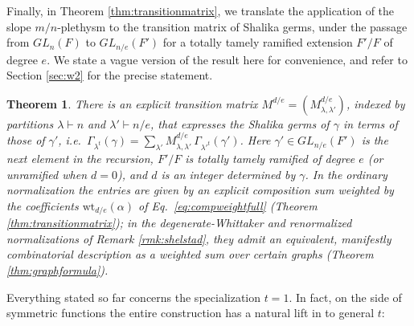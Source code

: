 \documentclass{amsart}
\numberwithin{equation}{section}
\newtheorem{theorem}[lemma]{Theorem}%
\theoremstyle{definition}
\newcommand{\wt}{\mathrm{wt}}
\begin{document}
Finally, in Theorem \ref{thm:transitionmatrix}, we translate the application of the slope $m/n$-plethysm to the transition matrix of Shalika germs, under the passage from $GL_n(F)$ to $GL_{n/e}(F')$ for a totally tamely ramified extension $F'/F$ of degree $e$. 
We state a vague version of the result here for convenience, and refer to Section \ref{sec:w2} for the precise statement. 
\begin{theorem}\label{thm:transitionforSha}
There is an explicit transition matrix $M^{d/e}=(M^{d/e}_{\lambda,\lambda'})$, indexed by partitions $\lambda\vdash n$ and $\lambda'\vdash n/e$, that expresses the Shalika germs of $\gamma$ in terms of those of $\gamma'$, i.e.\ $\Gamma_{\lambda^t}(\gamma)=\sum_{\lambda'}M^{d/e}_{\lambda,\lambda'}\,\Gamma_{{\lambda'}^t}(\gamma')$. Here $\gamma'\in GL_{n/e}(F')$ is the next element in the recursion, $F'/F$ is totally tamely ramified of degree $e$ (or unramified when $d=0$), and $d$ is an integer determined by $\gamma$. In the ordinary normalization the entries are given by an explicit composition sum weighted by the coefficients $\wt_{d/e}(\alpha)$ of Eq.~\eqref{eq:compweightfull} (Theorem \ref{thm:transitionmatrix}); in the degenerate-Whittaker and renormalized normalizations of Remark \ref{rmk:shelstad}, they admit an equivalent, manifestly combinatorial description as a weighted sum over certain graphs (Theorem \ref{thm:graphformula}).
\end{theorem}

Everything stated so far concerns the specialization $t=1$. In fact, on the side of symmetric functions the entire construction has a natural lift in to general $t$:
\end{document}
